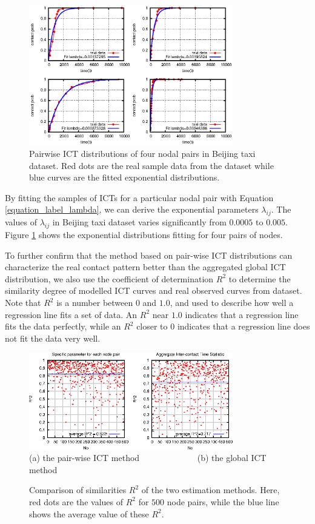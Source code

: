 \documentclass[conference]{IEEEtran}
\begin{document}
\begin{figure}[!h]
\centering
  \includegraphics[width=3.5in]{figures_1/multiplot-nodepair.eps}
  \caption{Pairwise ICT distributions of four nodal pairs in Beijing taxi dataset. Red dots are the real sample data from the dataset while blue curves are the fitted exponential distributions.}\label{figure_label_ICT_Distribution}
\end{figure}

By fitting the samples of ICTs for a particular nodal pair with Equation \ref{equation_label_lambda}, we can derive the exponential parameters $\lambda_{ij}$. The values of $\lambda_{ij}$ in Beijing taxi dataset varies significantly from $0.0005$ to $0.005$. Figure \ref{figure_label_ICT_Distribution} shows the exponential distributions fitting for four pairs of nodes.

To further confirm that the method based on pair-wise ICT distributions can characterize the real contact pattern better than the aggregated global ICT distribution, we also use the coefficient of determination $R^{2}$ \cite{ozer1985correlation} to determine the similarity degree of modelled ICT curves and real observed curves from dataset. Note that $R^{2}$ is a number between $0$ and $1.0$, and used to describe how well a regression line fits a set of data. An $R^{2}$ near $1.0$ indicates that a regression line fits the data perfectly, while an $R^{2}$ closer to $0$ indicates that a regression line does not fit the data very well.

\begin{figure}[!h]
\centering
  \includegraphics[width=3.5in]{figures_1/R2_comprision.eps}\\
  (a) the pair-wise ICT method \ \ \ \ \ \ \ \ \ \ \ \ \ (b) the global ICT method
  \caption{Comparison of similarities $R^2$ of the two estimation methods. Here, red dots are the values of $R^2$ for $500$ node pairs, while the blue line shows the average value of these $R^2$.}\label{figure_label_Comparison_between_R2}
\end{figure}
\end{document}
